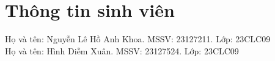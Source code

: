 \section{Thông tin sinh viên}
Họ và tên: Nguyễn Lê Hồ Anh Khoa.
MSSV: 23127211.
Lớp: 23CLC09 \\
Họ và tên: Hình Diễm Xuân.
MSSV: 23127524.
Lớp: 23CLC09
